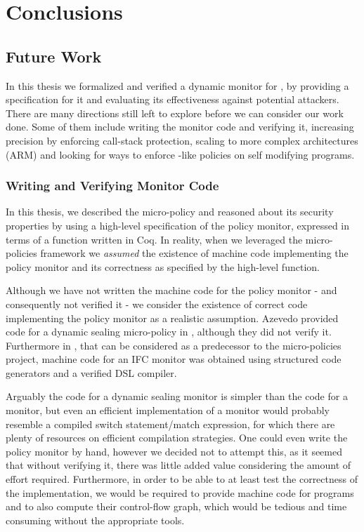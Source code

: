 \chapter{Conclusions}
\label{ch:conclusion}
\section{Future Work}

In this thesis we formalized and verified a dynamic monitor for \CFI,
by providing a specification for it and evaluating its effectiveness
against potential attackers. There are many directions still left to
explore before we can consider our work done. Some of them include
writing the \CFI monitor code and verifying it, increasing precision
by enforcing call-stack protection, scaling to more complex
architectures (\EG ARM) and looking for ways to enforce \CFI-like policies on
self modifying programs.

\subsection{Writing and Verifying Monitor Code}

In this thesis, we described the \CFI micro-policy and reasoned about
its security properties by using a high-level specification of the
policy monitor, expressed in terms of a \TRANSFER function written in
Coq. In reality, when we leveraged the micro-policies framework we
\emph{assumed} the existence of machine code implementing the \CFI
policy monitor and its correctness as specified by the high-level
\TRANSFER function.

Although we have not written the machine code for the policy monitor -
and consequently not verified it - we consider the existence of
correct code implementing the policy monitor as a realistic
assumption. Azevedo \ETAL provided code for a dynamic sealing
micro-policy in \cite{popl2015}, although they did not verify it.
Furthermore in \cite{PicoCoq2013}, that can be considered as a predecessor
to the micro-policies project, machine code for an IFC
monitor was obtained using structured code generators and a verified
DSL compiler.

Arguably the code for a dynamic sealing monitor is simpler than the
code for a \CFI monitor, but even an efficient implementation of a
\CFI monitor would probably resemble a compiled switch statement/match
expression, for which there are plenty of resources on efficient
compilation strategies. One could even write the \CFI policy monitor
by hand, however we decided not to attempt this, as it seemed that
without verifying it, there was little added value considering the
amount of effort required. Furthermore, in order to be able to at
least test the correctness of the implementation, we would be required
to provide machine code for programs and to also compute their control-flow
graph, which would be tedious and time consuming without the appropriate tools.

